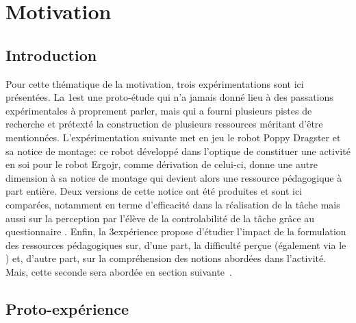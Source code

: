 \clearpage
\section{Motivation}\label{chap:3.2}
    \subsection{Introduction}
        Pour cette thématique de la motivation, trois expérimentations sont ici présentées. La 1\iere est une proto-étude qui n'a jamais donné lieu à des passations expérimentales à proprement parler, mais qui a fourni plusieurs pistes de recherche et prétexté la construction de plusieurs ressources méritant d'être mentionnées. L'expérimentation suivante met en jeu le robot Poppy Dragster et sa notice de montage: ce robot développé dans l'optique de constituer une activité en soi pour le robot Ergojr, comme dérivation de celui-ci, donne une autre dimension à sa notice de montage qui devient alors une ressource pédagogique à part entière. Deux versions de cette notice ont été produites et sont ici comparées, notamment en terme d'efficacité dans la réalisation de la tâche mais aussi sur la perception par l'élève de la controlabilité de la tâche grâce au questionnaire . Enfin, la 3\ieme expérience propose d'étudier l'impact de la formulation des ressources pédagogiques sur, d'une part, la difficulté perçue (également via le ) et, d'autre part, sur la compréhension des notions abordées dans l'activité. Mais, cette seconde sera abordée en section suivante~.
    \subsection{Proto-expérience}
